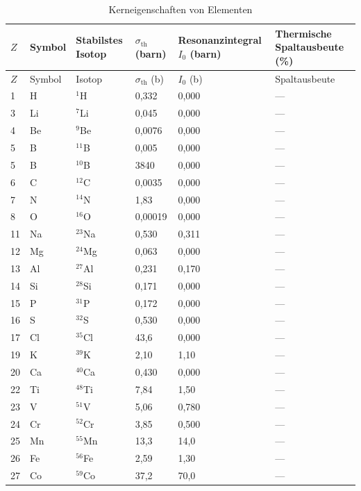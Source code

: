 \documentclass[12pt,a4paper]{article}
\begin{document}
	\begin{longtable}{p{0.8cm}p{1.2cm}p{2.0cm}p{2.5cm}p{2.5cm}p{2.5cm}}
		\caption{Kerneigenschaften von Elementen} \label{tab:nuclear-properties-func} \\
		\toprule
		\(Z\) & Symbol & Stabilstes Isotop & \(\sigma_{\text{th}}\) (barn) & Resonanzintegral \(I_0\) (barn) & Thermische Spaltausbeute (\%) \\
		\midrule
		\endfirsthead
		\toprule
		\(Z\) & Symbol & Isotop & \(\sigma_{\text{th}}\) (b) & \(I_0\) (b) & Spaltausbeute \\
		\midrule
		\endhead
		1  & H  & \(^{1}\)H & 0,332 & 0,000 & --- \\
		3  & Li & \(^{7}\)Li & 0,045 & 0,000 & --- \\
		4  & Be & \(^{9}\)Be & 0,0076 & 0,000 & --- \\
		5  & B  & \(^{11}\)B & 0,005 & 0,000 & --- \\
		5  & B  & \(^{10}\)B & 3840 & 0,000 & --- \\
		6  & C  & \(^{12}\)C & 0,0035 & 0,000 & --- \\
		7  & N  & \(^{14}\)N & 1,83 & 0,000 & --- \\
		8  & O  & \(^{16}\)O & 0,00019 & 0,000 & --- \\
		11 & Na & \(^{23}\)Na & 0,530 & 0,311 & --- \\
		12 & Mg & \(^{24}\)Mg & 0,063 & 0,000 & --- \\
		13 & Al & \(^{27}\)Al & 0,231 & 0,170 & --- \\
		14 & Si & \(^{28}\)Si & 0,171 & 0,000 & --- \\
		15 & P  & \(^{31}\)P & 0,172 & 0,000 & --- \\
		16 & S  & \(^{32}\)S & 0,530 & 0,000 & --- \\
		17 & Cl & \(^{35}\)Cl & 43,6 & 0,000 & --- \\
		19 & K  & \(^{39}\)K & 2,10 & 1,10 & --- \\
		20 & Ca & \(^{40}\)Ca & 0,430 & 0,000 & --- \\
		22 & Ti & \(^{48}\)Ti & 7,84 & 1,50 & --- \\
		23 & V  & \(^{51}\)V & 5,06 & 0,780 & --- \\
		24 & Cr & \(^{52}\)Cr & 3,85 & 0,500 & --- \\
		25 & Mn & \(^{55}\)Mn & 13,3 & 14,0 & --- \\
		26 & Fe & \(^{56}\)Fe & 2,59 & 1,30 & --- \\
		27 & Co & \(^{59}\)Co & 37,2 & 70,0 & --- \\

\end{longtable}
\end{document}
